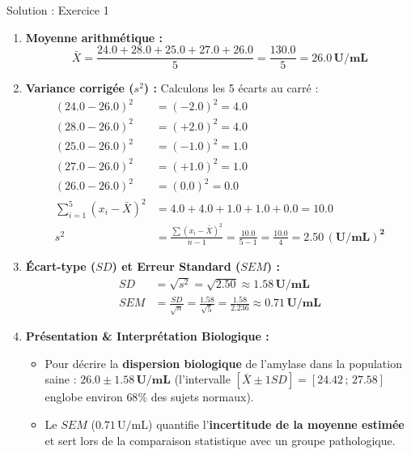 \documentclass[11pt,a4paper]{article}
\begin{document}
\begin{solutionbox}{Solution : Exercice 1}
\begin{enumerate}[label=\textbf{\alph*.}]
  \item \textbf{Moyenne arithmétique :}
  \begin{equation*}
    \bar{X} = \frac{24.0 + 28.0 + 25.0 + 27.0 + 26.0}{5} = \frac{130.0}{5} = \mathbf{26.0\,\text{U/mL}}
  \end{equation*}
  \item \textbf{Variance corrigée ($s^2$) :}
  Calculons les 5 écarts au carré :
  \begin{align*}
    (24.0 - 26.0)^2 &= (-2.0)^2 = 4.0 \\
    (28.0 - 26.0)^2 &= (+2.0)^2 = 4.0 \\
    (25.0 - 26.0)^2 &= (-1.0)^2 = 1.0 \\
    (27.0 - 26.0)^2 &= (+1.0)^2 = 1.0 \\
    (26.0 - 26.0)^2 &= (0.0)^2 = 0.0 \\[1mm]
    \sum_{i=1}^5 (x_i - \bar{X})^2 &= 4.0 + 4.0 + 1.0 + 1.0 + 0.0 = \mathbf{10.0} \\[2mm]
    s^2 &= \frac{\sum (x_i - \bar{X})^2}{n - 1} = \frac{10.0}{5 - 1} = \frac{10.0}{4} = \mathbf{2.50\,(\text{U/mL})^2}
  \end{align*}
  \item \textbf{Écart-type ($SD$) et Erreur Standard ($SEM$) :}
  \begin{align*}
    SD &= \sqrt{s^2} = \sqrt{2.50} \approx \mathbf{1.58\,\text{U/mL}} \\[2mm]
    SEM &= \frac{SD}{\sqrt{n}} = \frac{1.58}{\sqrt{5}} = \frac{1.58}{2.236} \approx \mathbf{0.71\,\text{U/mL}}
  \end{align*}
  \item \textbf{Présentation \& Interprétation Biologique :}
  \begin{itemize}
    \item Pour décrire la \textbf{dispersion biologique} de l'amylase dans la population saine : $\mathbf{26.0 \pm 1.58\,\text{U/mL}}$ (l'intervalle $[\bar{X} \pm 1 SD] = [24.42\,;\,27.58]$ englobe environ $68\%$ des sujets normaux).
    \item Le $SEM$ ($0.71\,\text{U/mL}$) quantifie l'\textbf{incertitude de la moyenne estimée} et sert lors de la comparaison statistique avec un groupe pathologique.
  \end{itemize}
\end{enumerate}
\end{solutionbox}
\end{document}
